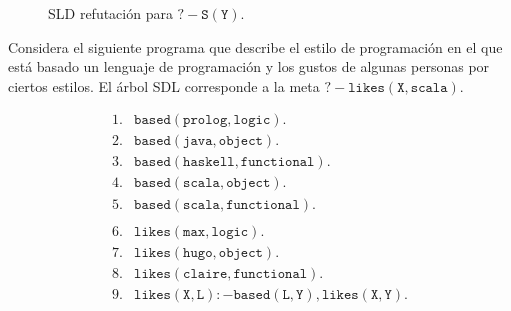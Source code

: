 \documentclass[11pt,letterpaper]{article}
\begin{document}
\begin{figure}[h!]
\centering
\begin{small}
\end{small}
\caption{SLD refutación para $\mathtt{?- S(Y).}$}
\end{figure}
\eeje

\beje
Considera el siguiente programa que describe el estilo de programaci\'on en el 
que est\'a basado un lenguaje de programaci\'on y los gustos de algunas 
personas por ciertos estilos. El \'arbol SDL corresponde a la meta 
$\mathtt{?-likes(X,scala).}$

\begin{small}
\[
 \begin{array}{rl}
  1. & \mathtt{based(prolog,logic).} \\
  2. & \mathtt{based(java,object).} \\
  3. & \mathtt{based(haskell,functional).} \\ 
  4. & \mathtt{based(scala,object).} \\
  5. & \mathtt{based(scala,functional).} \\\\
  6. & \mathtt{likes(max,logic).} \\
  7. & \mathtt{likes(hugo,object).} \\
  8. & \mathtt{likes(claire,functional).}\\
  9. & \mathtt{likes(X,L):- based(L,Y),likes(X,Y).}
 \end{array}
\]
\end{small}
\end{document}
